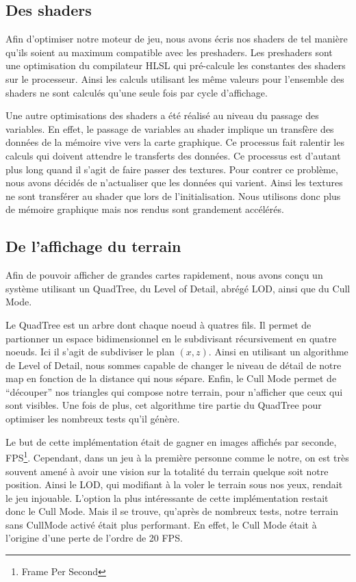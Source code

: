 \documentclass[11pt]{report}
\begin{document}
\subsection{Des shaders}

Afin d’optimiser notre moteur de jeu, nous avons écris nos shaders de tel manière qu’ils soient au maximum compatible avec les preshaders. Les preshaders sont une optimisation du compilateur HLSL qui pré-calcule les constantes des shaders sur le processeur. Ainsi les calculs utilisant les même valeurs pour l’ensemble des shaders ne sont calculés qu’une seule fois par cycle d'affichage.

Une autre optimisations des shaders a été réalisé au niveau du passage des variables. En effet, le passage de variables au shader implique un transfère des données de la mémoire vive vers la carte graphique. Ce processus fait ralentir les calculs qui doivent attendre le transferts des données. Ce processus est d’autant plus long quand il s’agit de faire passer des textures. Pour contrer ce problème, nous avons décidés de n’actualiser que les données qui varient. Ainsi les textures ne sont transférer au shader que lors de l’initialisation. Nous utilisons donc plus de mémoire graphique mais nos rendus sont grandement accélérés.

\subsection{De l'affichage du terrain}

Afin de pouvoir afficher de grandes cartes rapidement, nous avons conçu un système utilisant un QuadTree, du Level of Detail, abrégé LOD, ainsi que du Cull Mode.

Le QuadTree est un arbre dont chaque noeud à quatres fils. Il permet de partionner un espace bidimensionnel en le subdivisant récursivement en quatre noeuds. Ici il s'agit de subdiviser le plan \((x,z)\). Ainsi en utilisant un algorithme de Level of Detail, nous sommes capable de changer le niveau de détail de notre map en fonction de la distance qui nous sépare. Enfin, le Cull Mode permet de ``découper'' nos triangles qui compose notre terrain, pour n'afficher que ceux qui sont visibles. Une fois de plus, cet algorithme tire partie du QuadTree pour optimiser les nombreux tests qu'il génère.

Le but de cette implémentation était de gagner en images affichés par seconde, FPS\footnote{Frame Per Second}. Cependant, dans un jeu à la première personne comme le notre, on est très souvent amené à avoir une vision sur la totalité du terrain quelque soit notre position. Ainsi le LOD, qui modifiant à la voler le terrain sous nos yeux, rendait le jeu injouable. L'option la plus intéressante de cette implémentation restait donc le Cull Mode. Mais il se trouve, qu'après de nombreux tests, notre terrain sans CullMode activé était plus performant. En effet, le Cull Mode était à l'origine d'une perte de l'ordre de 20 FPS.
\end{document}
